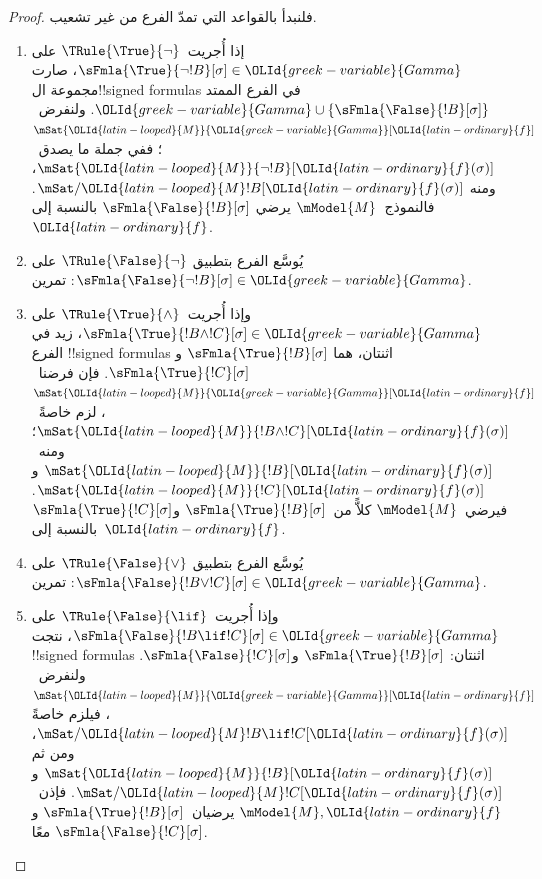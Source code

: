 \documentclass[../../../include/open-logic-section]{subfiles}
\begin{document}
\begin{proof}
فلنبدأ بالقواعد التي تمدّ الفرع من غير تشعيب.
\begin{enumerate}
\item إذا أُجريت~$\TRule{\True}{\lnot}$ على
  $\sFmla{\True}{\lnot !B}[\sigma] \in {\OLId{greek-variable}{Gamma}}$،
  صارت مجموعة ال!!{signed formula}s في الفرع الممتد
  ${\OLId{greek-variable}{Gamma}} \cup
  \{\sFmla{\False}{!B}[\sigma]\}$. ولنفرض~$\mSat{{\OLId{latin-looped}{M}}}{{\OLId{greek-variable}{Gamma}}}[{\OLId{latin-ordinary}{f}}]$؛
  ففي جملة ما يصدق~$\mSat{{\OLId{latin-looped}{M}}}{\lnot !B}[{\OLId{latin-ordinary}{f}}(\sigma)]$، ومنه
  $\mSat/{{\OLId{latin-looped}{M}}}{!B}[{\OLId{latin-ordinary}{f}}(\sigma)]$. فالنموذج~$\mModel{M}$ يرضي
  $\sFmla{\False}{!B}[\sigma]$ بالنسبة إلى~${\OLId{latin-ordinary}{f}}$.
\item يُوسَّع الفرع بتطبيق $\TRule{\False}{\lnot}$ على
  $\sFmla{\False}{\lnot !B}[\sigma] \in {\OLId{greek-variable}{Gamma}}$: تمرين.
\item وإذا أُجريت~$\TRule{\True}{\land}$ على
  $\sFmla{\True}{!B \land !C}[\sigma] \in {\OLId{greek-variable}{Gamma}}$،
  زيد في الفرع !!{signed formula}s اثنتان، هما
  $\sFmla{\True}{!B}[\sigma]$ و$\sFmla{\True}{!C}[\sigma]$.
  فإن فرضنا~$\mSat{{\OLId{latin-looped}{M}}}{{\OLId{greek-variable}{Gamma}}}[{\OLId{latin-ordinary}{f}}]$، لزم خاصةً~$\mSat{{\OLId{latin-looped}{M}}}{!B \land
    !C}[{\OLId{latin-ordinary}{f}}(\sigma)]$؛ ومنه~$\mSat{{\OLId{latin-looped}{M}}}{!B}[{\OLId{latin-ordinary}{f}}(\sigma)]$
  و$\mSat{{\OLId{latin-looped}{M}}}{!C}[{\OLId{latin-ordinary}{f}}(\sigma)]$. فيرضي~$\mModel{M}$
  كلاًّ من~$\sFmla{\True}{!B}[\sigma]$
  و$\sFmla{\True}{!C}[\sigma]$ بالنسبة إلى~${\OLId{latin-ordinary}{f}}$.
\item يُوسَّع الفرع بتطبيق $\TRule{\False}{\lor}$ على
  $\sFmla{\False}{!B \lor !C}[\sigma] \in {\OLId{greek-variable}{Gamma}}$: تمرين.
\item وإذا أُجريت~$\TRule{\False}{\lif}$ على
  $\sFmla{\False}{!B \lif !C}[\sigma] \in {\OLId{greek-variable}{Gamma}}$،
  نتجت !!{signed formula}s اثنتان:
  $\sFmla{\True}{!B}[\sigma]$ و$\sFmla{\False}{!C}[\sigma]$.
  ولنفرض~$\mSat{{\OLId{latin-looped}{M}}}{{\OLId{greek-variable}{Gamma}}}[{\OLId{latin-ordinary}{f}}]$، فيلزم خاصةً
  $\mSat/{{\OLId{latin-looped}{M}}}{!B \lif !C}[{\OLId{latin-ordinary}{f}}(\sigma)]$، ومن ثم
  $\mSat{{\OLId{latin-looped}{M}}}{!B}[{\OLId{latin-ordinary}{f}}(\sigma)]$ و$\mSat/{{\OLId{latin-looped}{M}}}{!C}[{\OLId{latin-ordinary}{f}}(\sigma)]$.
  فإذن~$\mModel{M}, {\OLId{latin-ordinary}{f}}$ يرضيان~$\sFmla{\True}{!B}[\sigma]$
  و$\sFmla{\False}{!C}[\sigma]$ معًا.


\end{enumerate}
\end{proof}
\end{document}
